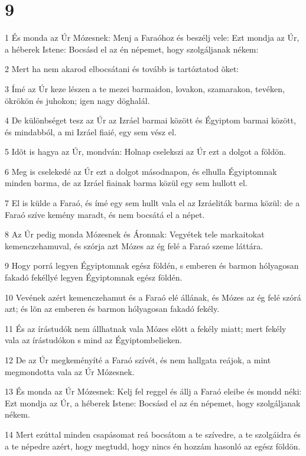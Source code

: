 \chapter{9}

\par 1 És monda az Úr Mózesnek: Menj a Faraóhoz és beszélj vele: Ezt mondja az Úr, a héberek Istene: Bocsásd el az én népemet, hogy szolgáljanak nékem:
\par 2 Mert ha nem akarod elbocsátani és tovább is tartóztatod õket:
\par 3 Ímé az Úr keze lészen a te mezei barmaidon, lovakon, szamarakon, tevéken, ökrökön és juhokon; igen nagy döghalál.
\par 4 De különbséget tesz az Úr az Izráel barmai között és Égyiptom barmai között, és mindabból, a mi Izráel fiaié, egy sem vész el.
\par 5 Idõt is hagya az Úr, mondván: Holnap cselekszi az Úr ezt a dolgot a földön.
\par 6 Meg is cselekedé az Úr ezt a dolgot másodnapon, és elhulla Égyiptomnak minden barma, de az Izráel fiainak barma közül egy sem hullott el.
\par 7 El is külde a Faraó, és ímé egy sem hullt vala el az Izráeliták barma közül: de a Faraó szíve kemény maradt, és nem bocsátá el a népet.
\par 8 Az Úr pedig monda Mózesnek és Áronnak: Vegyétek tele markaitokat kemenczehamuval, és szórja azt Mózes az ég felé a Faraó szeme láttára.
\par 9 Hogy porrá legyen Égyiptomnak egész földén, s emberen és barmon hólyagosan fakadó fekéllyé legyen Égyiptomnak egész földén.
\par 10 Vevének azért kemenczehamut és a Faraó elé állának, és Mózes az ég felé szórá azt; és lõn az emberen és barmon hólyagosan fakadó fekély.
\par 11 És az írástudók nem állhatnak vala Mózes elõtt a fekély miatt; mert fekély vala az írástudókon s mind az Égyiptombelieken.
\par 12 De az Úr megkeményíté a Faraó szívét, és nem hallgata reájok, a mint megmondotta vala az Úr Mózesnek.
\par 13 És monda az Úr Mózesnek: Kelj fel reggel és állj a Faraó eleibe és mondd néki: Ezt mondja az Úr, a héberek Istene: Bocsásd el az én népemet, hogy szolgáljanak nékem.
\par 14 Mert ezúttal minden csapásomat reá bocsátom a te szívedre, a te szolgáidra és a te népedre azért, hogy megtudd, hogy nincs én hozzám hasonló az egész földön.
